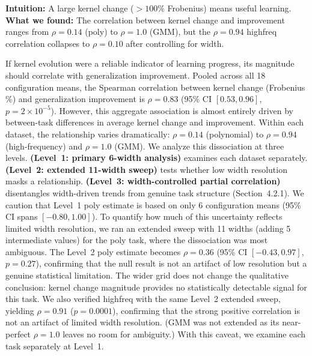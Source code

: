 \documentclass[twoside,11pt]{article}
\begin{document}
\noindent\textbf{Intuition:} A large kernel change ($>100\%$ Frobenius) means useful learning. \textbf{What we found:} The correlation between kernel change and improvement ranges from $\rho=0.14$ (poly) to $\rho=1.0$ (GMM), but the $\rho=0.94$ highfreq correlation collapses to $\rho=0.10$ after controlling for width.

If kernel evolution were a reliable indicator of learning progress, its magnitude should correlate with generalization improvement.  Pooled across all 18 configuration means, the Spearman correlation between kernel change (Frobenius \%) and generalization improvement is $\rho=0.83$ (95\% CI $[0.53, 0.96]$, $p=2\times10^{-5}$).  However, this aggregate association is almost entirely driven by between-task differences in average kernel change and improvement. Within each dataset, the relationship varies dramatically: $\rho=0.14$ (polynomial) to $\rho=0.94$ (high-frequency) and $\rho=1.0$ (GMM).  We analyze this dissociation at three levels.  \textbf{(Level~1: primary 6-width analysis)} examines each dataset separately.  \textbf{(Level~2: extended 11-width sweep)} tests whether low width resolution masks a relationship.  \textbf{(Level~3: width-controlled partial correlation)} disentangles width-driven trends from genuine task structure (Section~4.2.1).  We caution that Level~1 poly estimate is based on only 6 configuration means (95\% CI spans $[-0.80, 1.00]$). To quantify how much of this uncertainty reflects limited width resolution, we ran an extended sweep with 11 widths (adding 5 intermediate values) for the poly task, where the dissociation was most ambiguous. The Level~2 poly estimate becomes $\rho=0.36$ (95\% CI $[-0.43, 0.97]$, $p=0.27$), confirming that the null result is not an artifact of low resolution but a genuine statistical limitation. The wider grid does not change the qualitative conclusion: kernel change magnitude provides no statistically detectable signal for this task. We also verified highfreq with the same Level~2 extended sweep, yielding $\rho=0.91$ ($p=0.0001$), confirming that the strong positive correlation is not an artifact of limited width resolution. (GMM was not extended as its near-perfect $\rho=1.0$ leaves no room for ambiguity.) With this caveat, we examine each task separately at Level~1.
\end{document}
